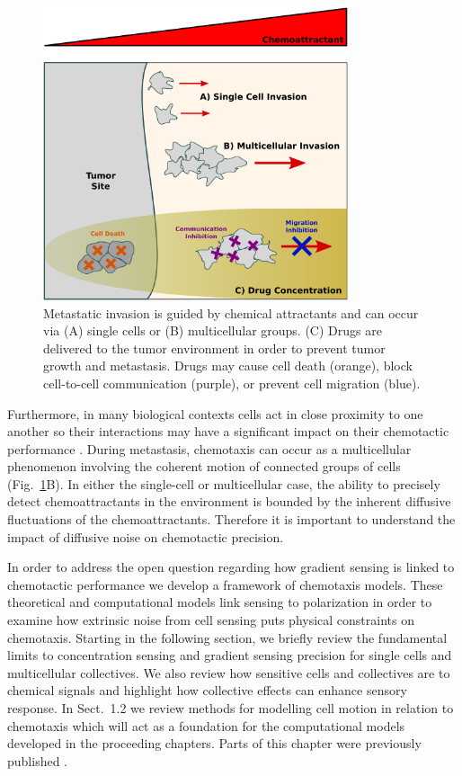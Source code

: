 \begin{figure}[ht]
    \centering
        \includegraphics[width=0.8\textwidth]{../fig/ch1_fig1.pdf}
    \caption{Metastatic invasion is guided by chemical attractants and can occur via (A) single cells or (B) multicellular groups. (C) Drugs are delivered to the tumor environment in order to prevent tumor growth and metastasis. Drugs may cause cell death (orange), block cell-to-cell communication (purple), or prevent cell migration (blue).}
\label{fig:ch1_1}
\end{figure}


Furthermore, in many biological contexts cells act in close proximity to one another so their interactions may have a significant impact on their chemotactic performance \cite{theveneau2010collective}. During metastasis, chemotaxis can occur as a multicellular phenomenon involving the coherent motion of connected groups of cells (Fig.\ \ref{fig:ch1_1}B). In either the single-cell or multicellular case, the ability to precisely detect chemoattractants in the environment is bounded by the inherent diffusive fluctuations of the chemoattractants. Therefore it is important to understand the impact of diffusive noise on chemotactic precision.

In order to address the open question regarding how gradient sensing is linked to chemotactic performance we develop a framework of chemotaxis models. These theoretical and computational models
link sensing to polarization in order to examine how extrinsic noise from cell sensing puts physical constraints on chemotaxis. Starting in the following section, we briefly review the fundamental limits to concentration sensing and gradient sensing precision for single cells and multicellular collectives.
We also review how sensitive cells and collectives are to chemical signals and highlight how collective effects can enhance sensory response.
In Sect.\ 1.2 we review methods for modelling cell motion in relation to chemotaxis which will act as a foundation for the computational models developed in the proceeding chapters. Parts of this chapter were previously published \cite{varennes2016sense}.



